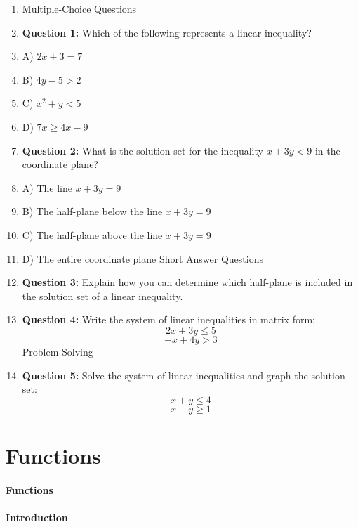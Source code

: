 \begin{enumerate}
    \item Multiple-Choice Questions
    \item \textbf{Question 1:} Which of the following represents a linear inequality?
    \item A) $2x + 3 = 7$
    \item B) $4y - 5 > 2$
    \item C) $x^2 + y < 5$
    \item D) $7x \geq 4x - 9$
    \item \textbf{Question 2:} What is the solution set for the inequality $x + 3y < 9$ in the coordinate plane?
    \item A) The line $x + 3y = 9$
    \item B) The half-plane below the line $x + 3y = 9$
    \item C) The half-plane above the line $x + 3y = 9$
    \item D) The entire coordinate plane Short Answer Questions
    \item \textbf{Question 3:} Explain how you can determine which half-plane is included in the solution set of a linear inequality.
    \item \textbf{Question 4:} Write the system of linear inequalities in matrix form: $$ 2x + 3y \leq 5 $$ $$ -x + 4y > 3$$ Problem Solving
    \item \textbf{Question 5:} Solve the system of linear inequalities and graph the solution set: $$ x + y \leq 4 $$ $$ x - y \geq 1 $$
\end{enumerate}

\section{Functions}
\label{sec:functions}

\paragraph{Functions}

\paragraph{Introduction}

